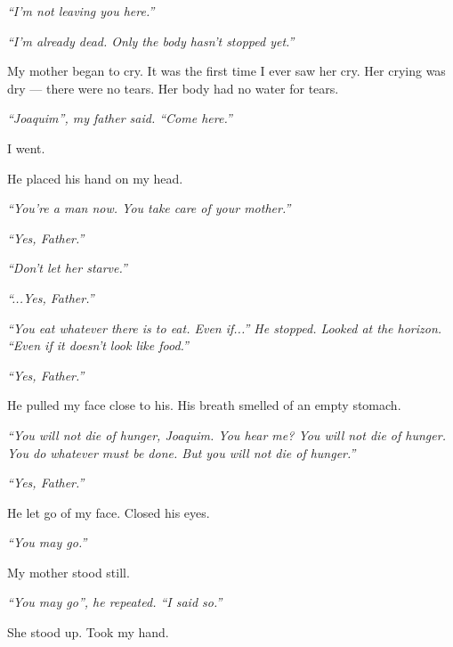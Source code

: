 \noindent \textit{\textquotedblleft{}I'm not leaving you here.\textquotedblright{}}

\noindent \textit{\textquotedblleft{}I'm already dead. Only the body hasn't stopped yet.\textquotedblright{}}

\noindent My mother began to cry. It was the first time I ever saw her cry. Her crying was dry --- there were no tears. Her body had no water for tears.

\noindent \textit{\textquotedblleft{}Joaquim\textquotedblright{}\textit{, my father said. }\textquotedblleft{}Come here.\textquotedblright{}}

\noindent I went.

\noindent He placed his hand on my head.

\noindent \textit{\textquotedblleft{}You're a man now. You take care of your mother.\textquotedblright{}}

\noindent \textit{\textquotedblleft{}Yes, Father.\textquotedblright{}}

\noindent \textit{\textquotedblleft{}Don't let her starve.\textquotedblright{}}

\noindent \textit{\textquotedblleft{}...Yes, Father.\textquotedblright{}}

\noindent \textit{\textquotedblleft{}You eat whatever there is to eat. Even if...\textquotedblright{}\textit{ He stopped. Looked at the horizon. }\textquotedblleft{}Even if it doesn't look like food.\textquotedblright{}}

\noindent \textit{\textquotedblleft{}Yes, Father.\textquotedblright{}}

\noindent He pulled my face close to his. His breath smelled of an empty stomach.

\noindent \textit{\textquotedblleft{}You will not die of hunger, Joaquim. You hear me? You will not die of hunger. You do whatever must be done. But you will not die of hunger.\textquotedblright{}}

\noindent \textit{\textquotedblleft{}Yes, Father.\textquotedblright{}}

\noindent He let go of my face. Closed his eyes.

\noindent \textit{\textquotedblleft{}You may go.\textquotedblright{}}

\noindent My mother stood still.

\noindent \textit{\textquotedblleft{}You may go\textquotedblright{}\textit{, he repeated. }\textquotedblleft{}I said so.\textquotedblright{}}

\noindent She stood up. Took my hand.

